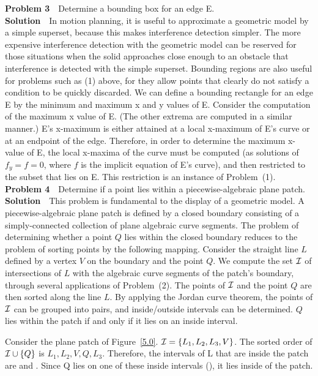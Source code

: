%
{\bf Problem 3}\ \ Determine a bounding box for an edge E.\\
%
{\bf Solution}\ \ In motion planning, it is useful to approximate a
geometric model by a simple superset, because this makes interference
detection simpler.
The more expensive interference detection with the geometric model can
be reserved for those situations when the solid approaches close enough
to an obstacle that interference is detected with the simple superset.
Bounding regions are also useful for problems such as (1) above, 
for they allow
points that clearly do not satisfy a condition to be quickly discarded.
We can define a bounding rectangle for an edge E by the minimum and maximum
x and y values of E.
Consider the computation of the maximum x value of E.
(The other extrema are computed in a similar manner.)
E's x-maximum is either attained at a local x-maximum of E's curve 
or at an endpoint of the edge.
Therefore, in order to determine the maximum x-value of E,
the local x-maxima of the curve must be computed (as solutions of 
$f_{y} = f = 0$, where $f$ is the implicit equation of E's curve), 
and then restricted to the subset that lies on E.
This restriction is an instance of\vspace{.5in} Problem~(1).\\
%
{\bf Problem 4}\ \
Determine if a point lies within a piecewise-algebraic plane patch.\\
{\bf Solution}\ \
This problem is fundamental to the display of a geometric model.
A piecewise-algebraic plane patch is defined by a closed boundary consisting
of a simply-connected collection of plane algebraic curve segments.
The problem of determining whether 
a point $Q$ lies within the closed boundary 
reduces to the problem of sorting points by the following mapping.
Consider the straight line $L$ defined by a vertex $V$ on the boundary
and the point $Q$.
We compute the set ${\cal I}$ of intersections of $L$ with the algebraic curve
segments 
of the patch's boundary, through several applications of Problem~(2).
The points of ${\cal I}$ and the point $Q$ are then sorted along the line $L$.
By applying the Jordan curve theorem, the points of ${\cal I}$ can be grouped into
pairs, and inside/outside intervals can be determined.
$Q$ lies within the patch if and only if it lies on an inside interval.
%
\figg{5.0}{Deciding if Q lies inside the plane patch}{2.25in}
%
\begin{example}
Consider the plane patch of Figure~\ref{5.0}.
${\cal I} = \{L_{1},L_{2},L_{3},V\}$.
The sorted order of ${\cal I} \cup \{Q\}$ is $L_{1},L_{2},V,Q,L_{3}$.
Therefore, the intervals of L that are inside the patch are
\seg{L_{1}L_{2}} and .
Since Q lies on one of these inside intervals (\seg{VL_{3}}),
it lies inside of the patch.
\end{example}
